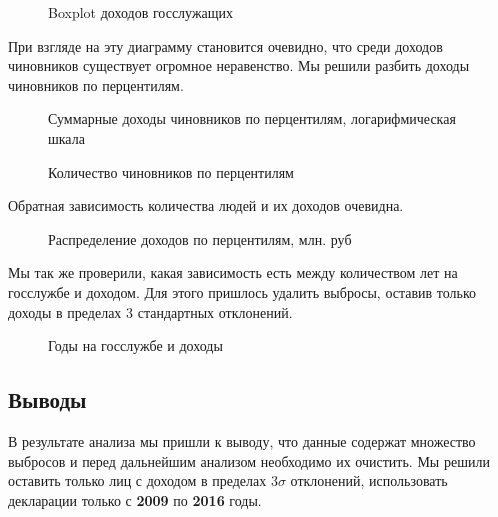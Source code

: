 \documentclass[a4paper,14pt]{article}
\begin{document}
  \begin{figure}[H]
    \centering
    \caption{Boxplot доходов госслужащих}
  \end{figure}

  При взгляде на эту диаграмму становится очевидно, что среди доходов чиновников существует огромное неравенство. Мы решили разбить доходы чиновников по перцентилям.

  \begin{figure}[H]
    \centering
    \caption{Суммарные доходы чиновников по перцентилям, логарифмическая шкала}
  \end{figure}

  \begin{figure}[H]
    \centering
    \caption{Количество чиновников по перцентилям}
  \end{figure}

  Обратная зависимость количества людей и их доходов очевидна.

  \begin{figure}[H]
    \centering
    \caption{Распределение доходов по перцентилям, млн. руб}

  \end{figure}

  Мы так же проверили, какая зависимость есть между количеством лет на госслужбе и доходом. Для этого пришлось удалить выбросы, оставив только доходы в пределах 3 стандартных отклонений.

  \begin{figure}[H]
    \centering
    \caption{Годы на госслужбе и доходы}
  \end{figure}

  \subsection{Выводы}

  В результате анализа мы пришли к выводу, что данные содержат множество выбросов и перед дальнейшим анализом необходимо их очистить. Мы решили оставить только лиц с доходом в пределах $3 \sigma$  отклонений, использовать декларации только с \textbf{2009} по \textbf{2016} годы.
\end{document}
